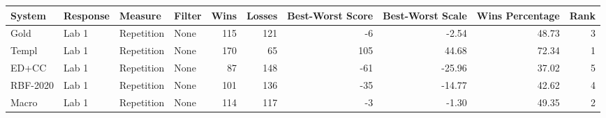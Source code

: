 \begin{tabular}{llllrrrrrr}
\toprule
System & Response & Measure & Filter & Wins & Losses & Best-Worst Score & Best-Worst Scale & Wins Percentage & Rank \\
\midrule
Gold & Lab 1 & Repetition & None & 115 & 121 & -6 & -2.54 & 48.73 & 3 \\
Templ & Lab 1 & Repetition & None & 170 & 65 & 105 & 44.68 & 72.34 & 1 \\
ED+CC & Lab 1 & Repetition & None & 87 & 148 & -61 & -25.96 & 37.02 & 5 \\
RBF-2020 & Lab 1 & Repetition & None & 101 & 136 & -35 & -14.77 & 42.62 & 4 \\
Macro & Lab 1 & Repetition & None & 114 & 117 & -3 & -1.30 & 49.35 & 2 \\
\bottomrule
\end{tabular}
